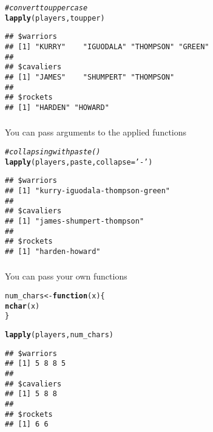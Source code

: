 \documentclass[12pt]{beamer}\usepackage[]{graphicx}\usepackage[]{color}
\makeatletter
\newcommand{\hlstr}[1]{\textcolor[rgb]{0.192,0.494,0.8}{#1}}%
\newcommand{\hlcom}[1]{\textcolor[rgb]{0.678,0.584,0.686}{\textit{#1}}}%
\newcommand{\hlstd}[1]{\textcolor[rgb]{0.345,0.345,0.345}{#1}}%
\newcommand{\hlkwa}[1]{\textcolor[rgb]{0.161,0.373,0.58}{\textbf{#1}}}%
\newcommand{\hlkwb}[1]{\textcolor[rgb]{0.69,0.353,0.396}{#1}}%
\newcommand{\hlkwc}[1]{\textcolor[rgb]{0.333,0.667,0.333}{#1}}%
\newcommand{\hlkwd}[1]{\textcolor[rgb]{0.737,0.353,0.396}{\textbf{#1}}}%
\newenvironment{kframe}{%
 \def\at@end@of@kframe{}%
 \ifinner\ifhmode%
  \def\at@end@of@kframe{\end{minipage}}%
  \begin{minipage}{\columnwidth}%
 \fi\fi%
 \def\FrameCommand##1{\hskip\@totalleftmargin \hskip-\fboxsep
 \colorbox{shadecolor}{##1}\hskip-\fboxsep
     \hskip-\linewidth \hskip-\@totalleftmargin \hskip\columnwidth}%
 \MakeFramed {\advance\hsize-\width
   \@totalleftmargin\z@ \linewidth\hsize
   \@setminipage}}%
 {\par\unskip\endMakeFramed%
 \at@end@of@kframe}
\newenvironment{knitrout}{}{} %
\makeatother
\begin{document}
\begin{frame}[fragile]
\frametitle{}

\begin{knitrout}\footnotesize
{}\color{fgcolor}\begin{kframe}
\begin{alltt}
\hlcom{# convert to upper case}
\hlkwd{lapply}\hlstd{(players, toupper)}
\end{alltt}
\begin{verbatim}
## $warriors
## [1] "KURRY"    "IGUODALA" "THOMPSON" "GREEN"   
## 
## $cavaliers
## [1] "JAMES"    "SHUMPERT" "THOMPSON"
## 
## $rockets
## [1] "HARDEN" "HOWARD"
\end{verbatim}
\end{kframe}
\end{knitrout}

\end{frame}


\begin{frame}[fragile]
\frametitle{}

You can pass arguments to the applied functions
\begin{knitrout}\footnotesize
{}\color{fgcolor}\begin{kframe}
\begin{alltt}
\hlcom{# collapsing with paste()}
\hlkwd{lapply}\hlstd{(players, paste,} \hlkwc{collapse} \hlstd{=} \hlstr{'-'}\hlstd{)}
\end{alltt}
\begin{verbatim}
## $warriors
## [1] "kurry-iguodala-thompson-green"
## 
## $cavaliers
## [1] "james-shumpert-thompson"
## 
## $rockets
## [1] "harden-howard"
\end{verbatim}
\end{kframe}
\end{knitrout}

\end{frame}


\begin{frame}[fragile]
\frametitle{}

You can pass your own functions
\begin{knitrout}\footnotesize
{}\color{fgcolor}\begin{kframe}
\begin{alltt}
\hlstd{num_chars} \hlkwb{<-} \hlkwa{function}\hlstd{(}\hlkwc{x}\hlstd{) \{}
  \hlkwd{nchar}\hlstd{(x)}
\hlstd{\}}

\hlkwd{lapply}\hlstd{(players, num_chars)}
\end{alltt}
\begin{verbatim}
## $warriors
## [1] 5 8 8 5
## 
## $cavaliers
## [1] 5 8 8
## 
## $rockets
## [1] 6 6
\end{verbatim}
\end{kframe}
\end{knitrout}

\end{frame}
\end{document}

